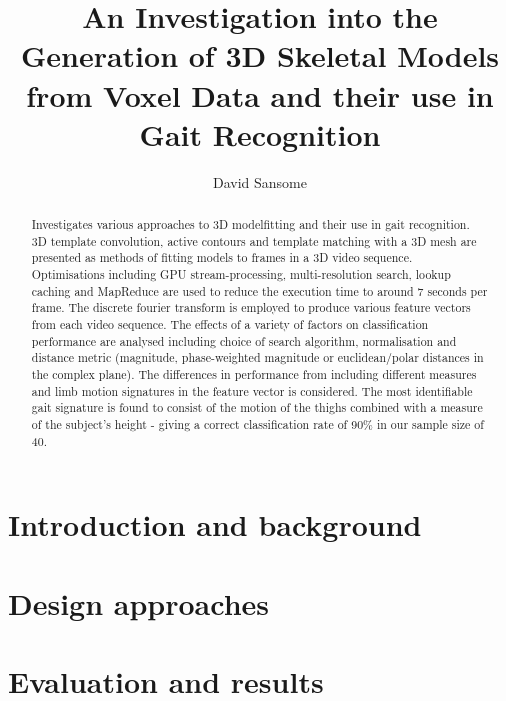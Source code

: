 \documentclass[a4paper,12pt]{report}
\title{An Investigation into the Generation of 3D Skeletal Models from Voxel Data and their use in Gait Recognition}
\author{David Sansome}
\begin{document}


\maketitle

\begin{abstract}
	Investigates various approaches to 3D modelfitting and their use in gait recognition.
	3D template convolution, active contours and template matching with a 3D mesh are presented as methods of fitting models to frames in a 3D video sequence.
	Optimisations including GPU stream-processing, multi-resolution search, lookup caching and MapReduce are used to reduce the execution time to around 7 seconds per frame.
	The discrete fourier transform is employed to produce various feature vectors from each video sequence.
	The effects of a variety of factors on classification performance are analysed including choice of search algorithm, normalisation and distance metric (magnitude, phase-weighted magnitude or euclidean/polar distances in the complex plane).
	The differences in performance from including different measures and limb motion signatures in the feature vector is considered.
	The most identifiable gait signature is found to consist of the motion of the thighs combined with a measure of the subject's height - giving a correct classification rate of 90\% in our sample size of 40.
\end{abstract}

\newpage

\tableofcontents

\chapter{Introduction and background}

\clearpage
\clearpage


\chapter{Design approaches}

\clearpage
\clearpage
\clearpage
\clearpage
\clearpage
\clearpage
\clearpage


\chapter{Evaluation and results}
\end{document}
